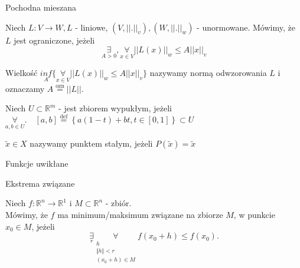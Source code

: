 \documentclass{article}
\begin{document}
\begin{definicja}
Pochodna mieszana
\end{definicja}
\begin{definicja}
Niech $L: V\to W, L$ - liniowe, $(V,||.||_v),(W,||.||_w)$ - unormowane.
Mówimy, że $L$ jest ograniczone, jeżeli
$$\underset{A>0}{\exists},\underset{x\in V}{\forall} ||L(x)||_w \leq A||x||_v$$
\end{definicja}
\begin{definicja}
Wielkość $\underset{A}{inf} \{\underset{x\in V}{\forall}||L(x)||_w \leq A||x||_v\}$ nazywamy normą odwzorowania $L$ i oznaczamy $A\overset{\text{ozn}}{=}||L||$.
\end{definicja}
\begin{definicja}
Niech $U\subset \mathbb{R}^m$ - jest zbiorem wypukłym, jeżeli $\underset{a,b\in U}{\forall}.\quad [a,b]\overset{\text{def}}{=} \left \{ a(1-t)+bt, t\in[0,1] \right \} \subset U$
\end{definicja}
\begin{definicja}
$\tilde x \in X$ nazywamy punktem stałym, jeżeli $P(\tilde x) = \tilde x$
\end{definicja}
\begin{definicja}
Funkcje uwikłane
\end{definicja}
\begin{definicja}
Ekstrema związane\\

\end{definicja}
\begin{definicja}
Niech $f:\mathbb{R}^{n}\to\mathbb{R}^1$ i $M\subset \mathbb{R}^n$ - zbiór.\\
Mówimy, że $f$ ma minimum/maksimum związane na zbiorze $M$, w punkcie $x_0\in M$, jeżeli
\[
\underset{r}{\exists} \underset{\substack{h\\  \Vert h \Vert < r \\ (x_0+h)\in M}}{\forall} f(x_0+h)\leq f(x_0)
.\]
\end{definicja}
\end{document}
